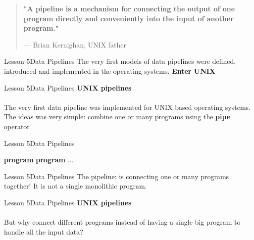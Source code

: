 \documentclass[aspectratio=1610]{beamer}
\begin{document}
\begin{frame}
\begin{center}
\Huge
\begin{quote}
\textbf{"A pipeline is a mechanism for connecting the output of one program directly and conveniently into the 
    input of another program."}
\begin{flushright}
{--- Brian Kernighan, UNIX father}	
\end{flushright}
\end{quote}
\end{center}
\end{frame}


\begin{frame}{Lesson 5}{Data Pipelines}
\Huge
 The very first models of data pipelines were defined, introduced and 
 implemented in the operating systems. \textbf{Enter UNIX}
 \end{frame}




\begin{frame}{Lesson 5}{Data Pipelines}
\LARGE
\textbf{UNIX pipelines}\\~\\
The very first data pipeline was implemented for UNIX based operating
systems. The ideas was very simple: combine one or many programs 
using the \textbf{pipe} operator \text{\textbar}
\end{frame}


\begin{frame}{Lesson 5}{Data Pipelines}
\Huge
\begin{center}
\textbf{program} \text{\textbar} \textbf{program} \text{\textbar} ... 
\end{center}
\end{frame}



\begin{frame}
\end{frame}


\begin{frame}{Lesson 5}{Data Pipelines}
\Huge
The pipeline: is connecting one or many programs together! It is not 
a single monolithic program.
\end{frame}


\begin{frame}{Lesson 5}{Data Pipelines}
\LARGE
\textbf{UNIX pipelines}\\~\\
\Huge
But why connect different programs instead of having a single big 
program to handle all the input data?
\end{frame}
\end{document}
